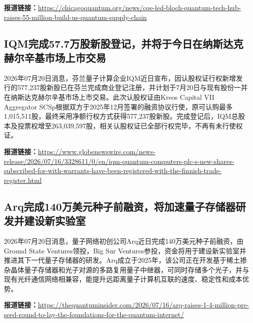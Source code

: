 \documentclass[12pt,a4paper]{ctexart}
\begin{document}
\noindent\textbf{报道链接：}\url{https://chicagoquantum.org/news/cqe-led-bloch-quantum-tech-hub-raises-55-million-build-us-quantum-supply-chain}

\subsection{ IQM完成57.7万股新股登记，并将于今日在纳斯达克赫尔辛基市场上市交易 }

2026年07月20日消息，芬兰量子计算企业IQM近日宣布，因认股权证行权新增发行的577,237股新股已在芬兰完成商业登记注册，并计划于7月20日与现有股份一并在纳斯达克赫尔辛基市场上市交易。此次认股权证由Kreos Capital VII Aggregator SCSp根据双方于2025年12月签署的融资协议行使，原可认购最多1,015,511股，最终采用净额行权方式获得577,237股新股。完成登记后，IQM总股本及投票权增至263,039,597股，相关认股权证已全部行权完毕，不再有未行使权证。

\noindent\textbf{报道链接：}\url{https://www.globenewswire.com/news-release/2026/07/16/3328611/0/en/iqm-quantum-computers-plc-s-new-shares-subscribed-for-with-warrants-have-been-registered-with-the-finnish-trade-register.html}

\subsection{ Arq完成140万美元种子前融资，将加速量子存储器研发并建设新实验室 }

2026年07月20日消息，量子网络初创公司Arq近日完成140万美元种子前融资，由Ground State Ventures领投，Big Sur Ventures参投，资金将用于建设新实验室并推进其下一代量子存储器的研发。Arq成立于2025年，该公司正在开发基于稀土掺杂晶体量子存储器和光子对源的多路复用量子中继器，可同时存储多个光子，并与现有光纤通信网络相兼容，能提升远距离量子计算机互联的速度、稳定性和成本优势。

\noindent\textbf{报道链接：}\url{https://thequantuminsider.com/2026/07/16/arq-raises-1-4-million-pre-seed-round-to-lay-the-foundations-for-the-quantum-internet/}
\end{document}

